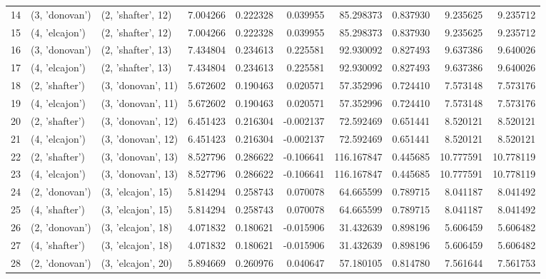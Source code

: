 \begin{tabular}{lllrrrrrrr}
14 &   (3, 'donovan') &  (2, 'shafter', 12) &  7.004266 &  0.222328 &  0.039955 &   85.298373 &  0.837930 &   9.235625 &   9.235712 \\
15 &   (4, 'elcajon') &  (2, 'shafter', 12) &  7.004266 &  0.222328 &  0.039955 &   85.298373 &  0.837930 &   9.235625 &   9.235712 \\
16 &   (3, 'donovan') &  (2, 'shafter', 13) &  7.434804 &  0.234613 &  0.225581 &   92.930092 &  0.827493 &   9.637386 &   9.640026 \\
17 &   (4, 'elcajon') &  (2, 'shafter', 13) &  7.434804 &  0.234613 &  0.225581 &   92.930092 &  0.827493 &   9.637386 &   9.640026 \\
18 &   (2, 'shafter') &  (3, 'donovan', 11) &  5.672602 &  0.190463 &  0.020571 &   57.352996 &  0.724410 &   7.573148 &   7.573176 \\
19 &   (4, 'elcajon') &  (3, 'donovan', 11) &  5.672602 &  0.190463 &  0.020571 &   57.352996 &  0.724410 &   7.573148 &   7.573176 \\
20 &   (2, 'shafter') &  (3, 'donovan', 12) &  6.451423 &  0.216304 & -0.002137 &   72.592469 &  0.651441 &   8.520121 &   8.520121 \\
21 &   (4, 'elcajon') &  (3, 'donovan', 12) &  6.451423 &  0.216304 & -0.002137 &   72.592469 &  0.651441 &   8.520121 &   8.520121 \\
22 &   (2, 'shafter') &  (3, 'donovan', 13) &  8.527796 &  0.286622 & -0.106641 &  116.167847 &  0.445685 &  10.777591 &  10.778119 \\
23 &   (4, 'elcajon') &  (3, 'donovan', 13) &  8.527796 &  0.286622 & -0.106641 &  116.167847 &  0.445685 &  10.777591 &  10.778119 \\
24 &   (2, 'donovan') &  (3, 'elcajon', 15) &  5.814294 &  0.258743 &  0.070078 &   64.665599 &  0.789715 &   8.041187 &   8.041492 \\
25 &   (4, 'shafter') &  (3, 'elcajon', 15) &  5.814294 &  0.258743 &  0.070078 &   64.665599 &  0.789715 &   8.041187 &   8.041492 \\
26 &   (2, 'donovan') &  (3, 'elcajon', 18) &  4.071832 &  0.180621 & -0.015906 &   31.432639 &  0.898196 &   5.606459 &   5.606482 \\
27 &   (4, 'shafter') &  (3, 'elcajon', 18) &  4.071832 &  0.180621 & -0.015906 &   31.432639 &  0.898196 &   5.606459 &   5.606482 \\
28 &   (2, 'donovan') &  (3, 'elcajon', 20) &  5.894669 &  0.260976 &  0.040647 &   57.180105 &  0.814780 &   7.561644 &   7.561753 \\

\end{tabular}
